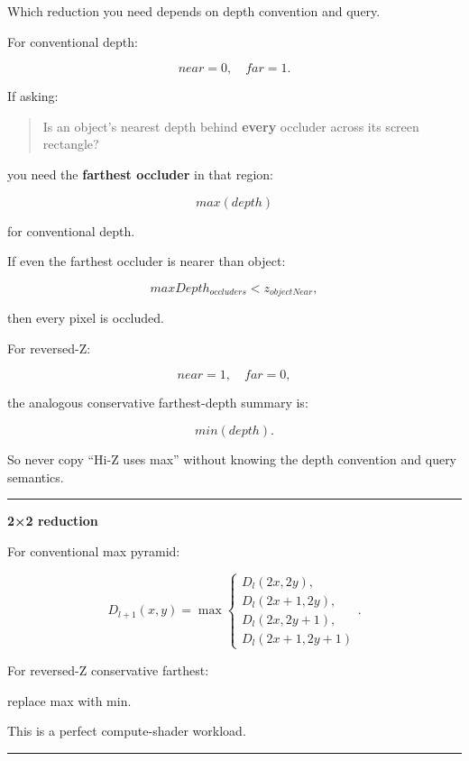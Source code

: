 \hypertarget{04-visual-computing-ii-ch040-min-depth-vs-max-depth-pyramid}{}

Which reduction you need depends on depth convention and query.

For conventional depth:

\[
near=0,\quad far=1.
\]

If asking:

\begin{quote}
Is an object's nearest depth behind \textbf{every} occluder across its screen rectangle?
\end{quote}

you need the \textbf{farthest occluder} in that region:

\[
\boxed{
max(depth)
}
\]

for conventional depth.

If even the farthest occluder is nearer than object:

\[
maxDepth_{occluders}
<
z_{objectNear},
\]

then every pixel is occluded.

For reversed-Z:

\[
near=1,\quad far=0,
\]

the analogous conservative farthest-depth summary is:

\[
\boxed{
min(depth).
}
\]

So never copy ``Hi-Z uses max'' without knowing the depth convention and query semantics.

\begin{center}\rule{0.5\linewidth}{0.5pt}\end{center}

\textbf{2×2 reduction}

For conventional max pyramid:

\[
D_{l+1}(x,y)
=
\max
\begin{cases}
D_l(2x,2y),\\
D_l(2x+1,2y),\\
D_l(2x,2y+1),\\
D_l(2x+1,2y+1)
\end{cases}.
\]

For reversed-Z conservative farthest:

replace max with min.

This is a perfect compute-shader workload.

\begin{center}\rule{0.5\linewidth}{0.5pt}\end{center}

